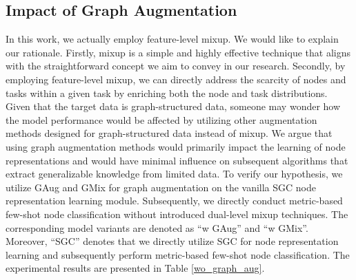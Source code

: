 \subsection{Impact of Graph Augmentation}
In this work, we actually employ feature-level mixup. We would like to explain our rationale. Firstly, mixup is a simple and highly effective technique that aligns with the straightforward concept we aim to convey in our research. Secondly, by employing feature-level mixup, we can directly address the scarcity of nodes and tasks within a given task by enriching both the node and task distributions. Given that the target data is graph-structured data, someone may wonder how the model performance would be affected by utilizing other augmentation methods designed for graph-structured data instead of mixup. We argue that using graph augmentation methods would primarily impact the learning of node representations and would have minimal influence on subsequent algorithms that extract generalizable knowledge from limited data. To verify our hypothesis, we utilize GAug \cite{zhao2021data} and GMix \cite{wang2021mixup} for graph augmentation on the vanilla SGC \cite{wu2019simplifying} node representation learning module. Subsequently, we directly conduct metric-based few-shot node classification without introduced dual-level mixup techniques. The corresponding model variants are denoted as ``w GAug'' and ``w GMix''. Moreover, ``SGC'' denotes that we directly utilize SGC for node representation learning and subsequently perform metric-based few-shot node classification. The experimental results are presented in Table \ref{wo_graph_aug}.


